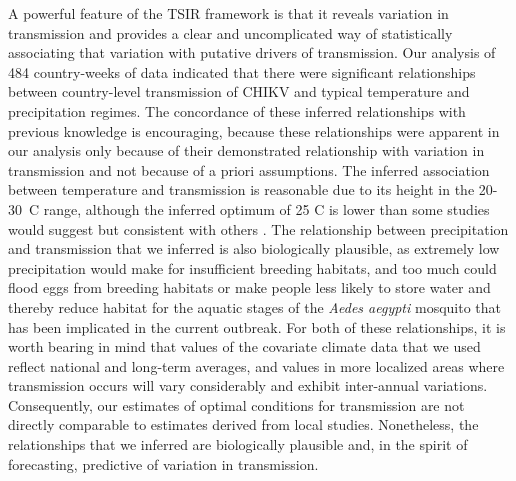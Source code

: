 \documentclass[11pt]{article}
\begin{document}
A powerful feature of the TSIR framework is that it reveals variation in transmission and provides a clear and uncomplicated way of statistically associating that variation with putative drivers of transmission. Our analysis of 484 country-weeks of data indicated that there were significant relationships between country-level transmission of CHIKV and typical temperature and precipitation regimes. The concordance of these inferred relationships with previous knowledge is encouraging, because these relationships were apparent in our analysis only because of their demonstrated relationship with variation in transmission and not because of a priori assumptions. The inferred association between temperature and transmission is reasonable due to its height in the 20-30~\degree C range, although the inferred optimum of 25 \degree C is lower than some studies would suggest \cite{Chan2012,Johansson2014} but consistent with others \cite{Brady2014}. The relationship between precipitation and transmission that we inferred is also biologically plausible, as extremely low precipitation would make for insufficient breeding habitats, and too much could flood eggs from breeding habitats or make people less likely to store water and thereby reduce habitat for the aquatic stages of the \textit{Aedes aegypti} mosquito that has been implicated in the current outbreak. For both of these relationships, it is worth bearing in mind that values of the covariate climate data that we used reflect national and long-term averages, and values in more localized areas where transmission occurs will vary considerably and exhibit inter-annual variations. Consequently, our estimates of optimal conditions for transmission are not directly comparable to estimates derived from local studies. Nonetheless, the relationships that we inferred are biologically plausible and, in the spirit of forecasting, predictive of variation in transmission.
\end{document}
